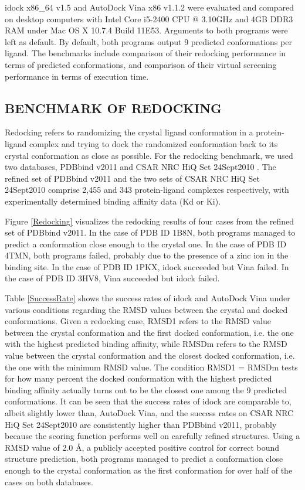 \documentclass[12pt]{article}
\begin{document}
idock x86\_64 v1.5 and AutoDock Vina x86 v1.1.2 were evaluated and compared on desktop computers with Intel Core i5-2400 CPU @ 3.10GHz and 4GB DDR3 RAM under Mac OS X 10.7.4 Build 11E53. Arguments to both programs were left as default. By default, both programs output 9 predicted conformations per ligand. The benchmarks include comparison of their redocking performance in terms of predicted conformations, and comparison of their virtual screening performance in terms of execution time.

\subsection*{\sffamily \large BENCHMARK OF REDOCKING}

Redocking refers to randomizing the crystal ligand conformation in a protein-ligand complex and trying to dock the randomized conformation back to its crystal conformation as close as possible. For the redocking benchmark, we used two databases, PDBbind v2011 \citep{529,530} and CSAR NRC HiQ Set 24Sept2010 \citep{857,960}. The refined set of PDBbind v2011 and the two sets of CSAR NRC HiQ Set 24Sept2010 comprise 2,455 and 343 protein-ligand complexes respectively, with experimentally determined binding affinity data (Kd or Ki).

Figure \ref{Redocking} visualizes the redocking results of four cases from the refined set of PDBbind v2011. In the case of PDB ID 1B8N, both programs managed to predict a conformation close enough to the crystal one. In the case of PDB ID 4TMN, both programs failed, probably due to the presence of a zinc ion in the binding site. In the case of PDB ID 1PKX, idock succeeded but Vina failed. In the case of PDB ID 3HV8, Vina succeeded but idock failed.

Table \ref{SuccessRate} shows the success rates of idock and AutoDock Vina under various conditions regarding the RMSD values between the crystal and docked conformations. Given a redocking case, RMSD1 refers to the RMSD value between the crystal conformation and the first docked conformation, i.e. the one with the highest predicted binding affinity, while RMSDm refers to the RMSD value between the crystal conformation and the closest docked conformation, i.e. the one with the minimum RMSD value. The condition RMSD1 = RMSDm tests for how many percent the docked conformation with the highest predicted binding affinity actually turns out to be the closest one among the 9 predicted conformations. It can be seen that the success rates of idock are comparable to, albeit slightly lower than, AutoDock Vina, and the success rates on CSAR NRC HiQ Set 24Sept2010 are consistently higher than PDBbind v2011, probably because the scoring function performs well on carefully refined structures. Using a RMSD value of 2.0 \AA, a publicly accepted positive control for correct bound structure prediction, both programs managed to predict a conformation close enough to the crystal conformation as the first conformation for over half of the cases on both databases.
\end{document}
